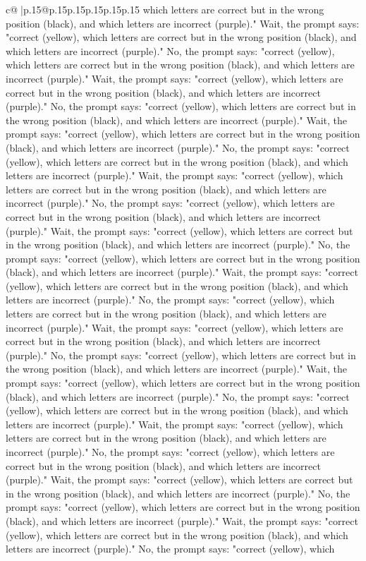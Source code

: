 \documentclass{article}
\begin{document}
{\begin{supertabular}{c@{$\;$}|p{.15\linewidth}@{}p{.15\linewidth}p{.15\linewidth}p{.15\linewidth}p{.15\linewidth}p{.15\linewidth}}
{{{which letters are correct but in the wrong position (black), and which letters are incorrect (purple)." Wait, the prompt says: "correct (yellow), which letters are correct but in the wrong position (black), and which letters are incorrect (purple)." No, the prompt says: "correct (yellow), which letters are correct but in the wrong position (black), and which letters are incorrect (purple)." Wait, the prompt says: "correct (yellow), which letters are correct but in the wrong position (black), and which letters are incorrect (purple)." No, the prompt says: "correct (yellow), which letters are correct but in the wrong position (black), and which letters are incorrect (purple)." Wait, the prompt says: "correct (yellow), which letters are correct but in the wrong position (black), and which letters are incorrect (purple)." No, the prompt says: "correct (yellow), which letters are correct but in the wrong position (black), and which letters are incorrect (purple)." Wait, the prompt says: "correct (yellow), which letters are correct but in the wrong position (black), and which letters are incorrect (purple)." No, the prompt says: "correct (yellow), which letters are correct but in the wrong position (black), and which letters are incorrect (purple)." Wait, the prompt says: "correct (yellow), which letters are correct but in the wrong position (black), and which letters are incorrect (purple)." No, the prompt says: "correct (yellow), which letters are correct but in the wrong position (black), and which letters are incorrect (purple)." Wait, the prompt says: "correct (yellow), which letters are correct but in the wrong position (black), and which letters are incorrect (purple)." No, the prompt says: "correct (yellow), which letters are correct but in the wrong position (black), and which letters are incorrect (purple)." Wait, the prompt says: "correct (yellow), which letters are correct but in the wrong position (black), and which letters are incorrect (purple)." No, the prompt says: "correct (yellow), which letters are correct but in the wrong position (black), and which letters are incorrect (purple)." Wait, the prompt says: "correct (yellow), which letters are correct but in the wrong position (black), and which letters are incorrect (purple)." No, the prompt says: "correct (yellow), which letters are correct but in the wrong position (black), and which letters are incorrect (purple)." Wait, the prompt says: "correct (yellow), which letters are correct but in the wrong position (black), and which letters are incorrect (purple)." No, the prompt says: "correct (yellow), which letters are correct but in the wrong position (black), and which letters are incorrect (purple)." Wait, the prompt says: "correct (yellow), which letters are correct but in the wrong position (black), and which letters are incorrect (purple)." No, the prompt says: "correct (yellow), which letters are correct but in the wrong position (black), and which letters are incorrect (purple)." Wait, the prompt says: "correct (yellow), which letters are correct but in the wrong position (black), and which letters are incorrect (purple)." No, the prompt says: "correct (yellow), which }}}
\end{supertabular}}
\end{document}
